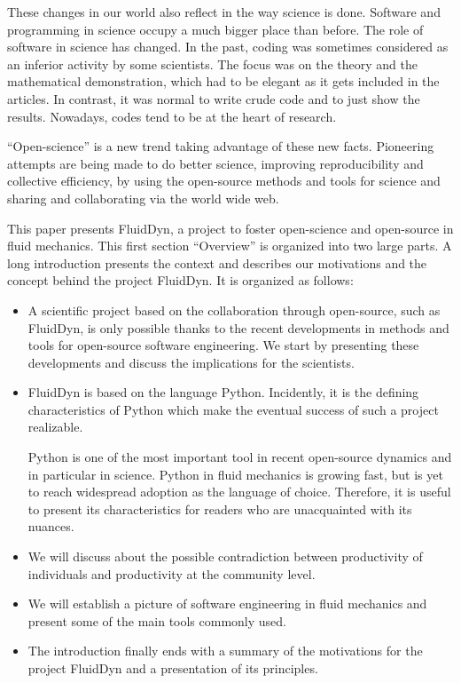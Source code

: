 These changes in our world also reflect in the way science is done.
%
Software and programming in science occupy a much bigger place than before.
%
%
The role of software in science has changed. In the past, coding was sometimes
considered as an inferior activity by some scientists.  The focus was on the
theory and the mathematical demonstration, which had to be elegant as it gets
included in the articles.  In contrast, it was normal to write crude code
and to just show the results. Nowadays, codes tend to be at the heart of
research.

``Open-science'' is a new trend taking advantage of these new facts.  Pioneering
attempts are being made to do better science, improving reproducibility and
collective efficiency, by using the open-source methods and tools for science
and sharing and collaborating via the world wide web.


This paper presents FluidDyn, a project to foster open-science and open-source in
fluid mechanics. This first section ``Overview'' is organized into two large
parts.  A long introduction presents the context and describes our motivations and
the concept behind the project FluidDyn.  It is organized as follows:
\begin{itemize}
\item A scientific project based on the collaboration through open-source, such
as FluidDyn, is only possible thanks to the recent developments in methods and
tools for open-source software engineering. We start by presenting these
developments and discuss the implications for the scientists.

\item FluidDyn is based on the language Python. Incidently, it is the defining
characteristics of Python which make the eventual success of such a
project realizable.

Python is one of the most important tool in recent open-source dynamics and in
particular in science.
%
Python in fluid mechanics is growing fast, but is yet to reach widespread
adoption as the language of choice. Therefore, it is useful to present its
characteristics for readers who are unacquainted with its nuances.

\item We will discuss about the possible contradiction between productivity of
individuals and productivity at the community level.

\item We will establish a picture of software engineering in fluid mechanics
and present some of the main tools commonly used.

\item The introduction finally ends with a summary of the motivations for the
project FluidDyn and a presentation of its principles.
\end{itemize}

